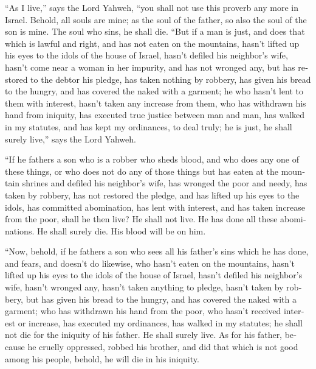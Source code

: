 \begin{paracol}{2}
\begin{otherlanguage}{english}
 ``As I live,'' says the Lord Yahweh, ``you shall not use
this proverb any more in Israel.  Behold, all souls are
mine; as the soul of the father, so also the soul of the son is mine.
The soul who sins, he shall die.  ``But if a man is just,
and does that which is lawful and right,  and has not
eaten on the mountains, hasn't lifted up his eyes to the idols of the
house of Israel, hasn't defiled his neighbor's wife, hasn't come near a
woman in her impurity,  and has not wronged any, but has
restored to the debtor his pledge, has taken nothing by robbery, has
given his bread to the hungry, and has covered the naked with a garment;
 he who hasn't lent to them with interest, hasn't taken
any increase from them, who has withdrawn his hand from iniquity, has
executed true justice between man and man,  has walked in
my statutes, and has kept my ordinances, to deal truly; he is just, he
shall surely live,'' says the Lord Yahweh.

 ``If he fathers a son who is a robber who sheds blood,
and who does any one of these things,  or who does not do
any of those things but has eaten at the mountain shrines and defiled
his neighbor's wife,  has wronged the poor and needy, has
taken by robbery, has not restored the pledge, and has lifted up his
eyes to the idols, has committed abomination,  has lent
with interest, and has taken increase from the poor, shall he then live?
He shall not live. He has done all these abominations. He shall surely
die. His blood will be on him.

 ``Now, behold, if he fathers a son who sees all his
father's sins which he has done, and fears, and doesn't do likewise,
 who hasn't eaten on the mountains, hasn't lifted up his
eyes to the idols of the house of Israel, hasn't defiled his neighbor's
wife,  hasn't wronged any, hasn't taken anything to
pledge, hasn't taken by robbery, but has given his bread to the hungry,
and has covered the naked with a garment;  who has
withdrawn his hand from the poor, who hasn't received interest or
increase, has executed my ordinances, has walked in my statutes; he
shall not die for the iniquity of his father. He shall surely live.
 As for his father, because he cruelly oppressed, robbed
his brother, and did that which is not good among his people, behold, he
will die in his iniquity.


\end{otherlanguage}
\end{paracol}
